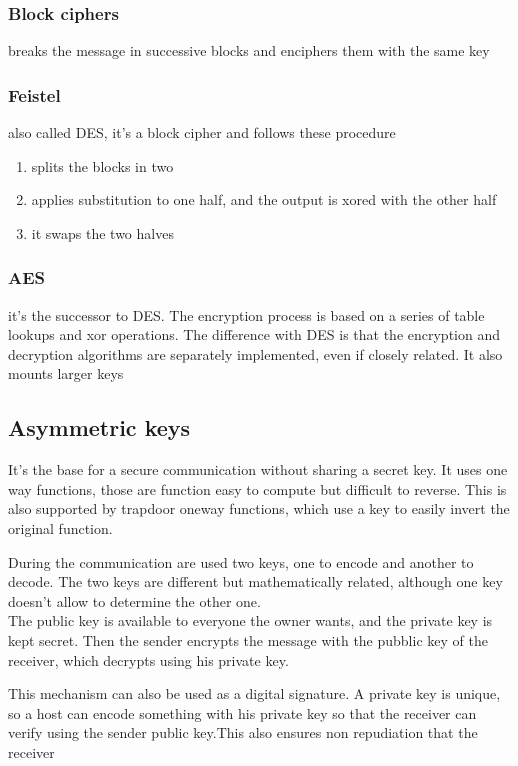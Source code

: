 \documentclass[12pt, a4paper]{article}
\begin{document}
\subsubsection*{Block ciphers}
breaks the message in successive blocks and enciphers them with the same key

\subsubsection{Feistel}
also called DES, it's a block cipher and follows these procedure
\begin{enumerate}
    \item splits the blocks in two
    \item applies substitution to one half, and the output is xored with the other half
    \item it swaps the two halves
\end{enumerate}

\subsubsection{AES}
it's the successor to DES. The encryption process is based on a series of table lookups and xor operations. The difference 
with DES is that the encryption and decryption algorithms are separately implemented, even if closely related. It also
mounts larger keys

\subsection{Asymmetric keys}
It's the base for a secure communication without sharing a secret key. It uses one way functions, those are function
easy to compute but difficult to reverse. This is also supported by trapdoor oneway functions, which use a key to 
easily invert the original function.

During the communication are used two keys, one to encode and another to decode. The two keys are different but 
mathematically related, although one key doesn't allow to determine the other one.\\The public key is available
to everyone the owner wants, and the private key is kept secret. Then the sender encrypts the message with the pubblic 
key of the receiver, which decrypts using his private key.

This mechanism can also be used as a digital signature. A private key is unique, so a host can encode something with his
private key so that the receiver can verify using the sender public key.This also ensures non repudiation 
that the receiver 
\end{document}

